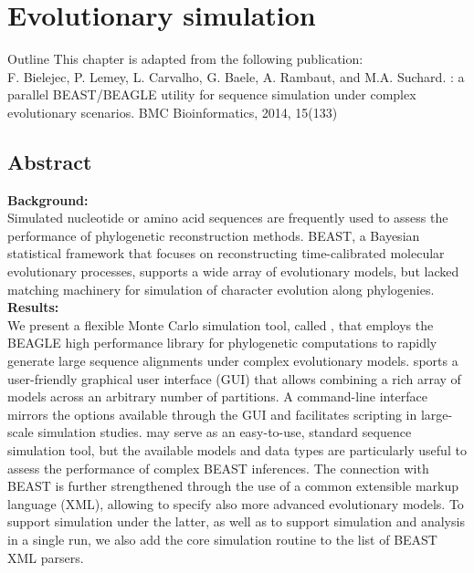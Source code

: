 \chapter{Evolutionary simulation\label{chap:pibuss}}

\begin{remark}{Outline}
This chapter is adapted from the following publication: \\
F. Bielejec, P. Lemey, L. Carvalho, G. Baele, A. Rambaut, and M.A. Suchard.
\bussname: a parallel BEAST/BEAGLE utility for sequence simulation under complex evolutionary scenarios.
BMC Bioinformatics, 2014, 15(133)
\end{remark}

\section{Abstract}
        
\textbf{Background:} \\
Simulated nucleotide or amino acid sequences are frequently used to assess the performance of phylogenetic reconstruction methods.
BEAST, a Bayesian statistical framework that focuses on reconstructing time-calibrated molecular evolutionary processes,
supports a wide array of evolutionary models, but lacked matching machinery 
for simulation of character evolution along phylogenies. \\

\noindent
\textbf{Results:} \\
We present a flexible Monte Carlo simulation tool, called {\bussname}, that employs the BEAGLE high performance library for phylogenetic computations to rapidly generate large sequence alignments under complex evolutionary models.
{\bussname} sports a user-friendly graphical user interface (GUI) that allows combining a rich array of models across an arbitrary number of partitions. 
A command-line interface mirrors the options available through the GUI and facilitates scripting in large-scale simulation studies.
{\bussname} may serve as an easy-to-use, standard sequence simulation tool, but the available models and data types are particularly useful to assess the performance of complex BEAST inferences.
The connection with BEAST is further strengthened through the use of a common extensible markup language (XML), allowing to specify also more advanced evolutionary models.
To support simulation under the latter, as well as to support simulation and analysis in a single run, we also add the {\bussname} core simulation routine to the list of BEAST XML parsers.\\

